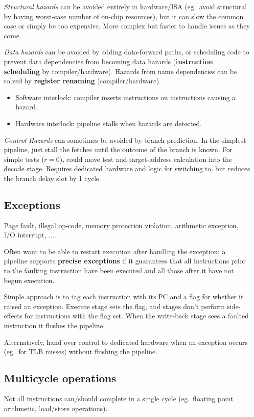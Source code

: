 \documentclass[11pt]{article}
\begin{document}
{{        \textit{Structural hazards} can be avoided entirely in hardware/ISA (eg.\ avoid structural by having worst-case number of on-chip resources), but it can slow the common case or simply be too expensive. More complex but faster to handle issues as they come.

        \textit{Data hazards} can be avoided by adding data-forward paths, or scheduling code to prevent data dependencies from becoming data hazards (\textbf{instruction scheduling} by compiler/hardware). Hazards from name dependencies can be solved by \textbf{register renaming} (compiler/hardware).

        \begin{itemize}
        \item Software interlock: compiler inserts instructions on instructions causing a hazard.
        \item Hardware interlock: pipeline stalls when hazards are detected.
        \end{itemize}

        \textit{Control Hazards} can sometimes be avoided by branch prediction. In the simplest pipeline, just stall the fetches until the outcome of the branch is known. For simple tests (\(r = 0\)), could move test and target-address calculation into the decode stage. Requires dedicated hardware and logic for switching to, but reduces the branch delay slot by 1 cycle.
    }
    \subsection*{Exceptions}
    {
        Page fault, illegal op-code, memory protection violation, arithmetic exception, I/O interrupt, ....

        Often want to be able to restart execution after handling the exception: a pipeline supports \textbf{precise exceptions} if it guarantees that all instructions prior to the faulting instruction have been executed and all those after it have not begun execution.

        Simple approach is to tag each instruction with its PC and a flag for whether it raised an exception. Execute stage sets the flag, and stages don't perform side-effects for instructions with the flag set. When the write-back stage sees a faulted instruction it flushes the pipeline.

        Alternatively, hand over control to dedicated hardware when an exception occurs (eg.\ for TLB misses) without flushing the pipeline.
    }
    \subsection*{Multicycle operations}
    {
        Not all instructions can/should complete in a single cycle (eg.\ floating point arithmetic, load/store operations).

}}
\end{document}
